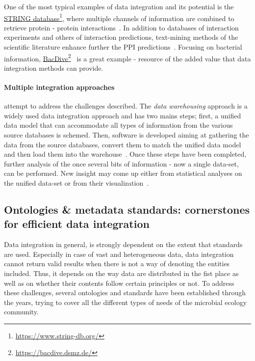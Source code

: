      One of the most typical examples of data integration and its potential
      is the \href{https://www.string-db.org/}{STRING database}\footnote{\href{https://www.string-db.org/}{https://www.string-db.org/}}, where multiple channels of information are combined 
      to retrieve protein - protein interactions~\citep{mering2003string, szklarczyk2021string}. 
      In addition to databases of interaction experiments and others of interaction predictions, text-mining methods of the scientific literature enhance further the 
      PPI predictions~\citep{szklarczyk2021string}.
      Focusing on bacterial information, \href{https://bacdive.dsmz.de/}{BacDive}\footnote{\href{https://bacdive.dsmz.de/}{https://bacdive.dsmz.de/}}~\citep{reimer2019bac}
      is a great example - resource of the added value that data integration methods can provide. 

      \paragraph{Multiple integration approaches} attempt to address the challenges described. 
      The \textit{data warehousing} approach is a widely used data integration approach and has two mains steps; 
      first, a unified data model that can accommodate all types of  
      information from the various source databases is schemed.
      Then, software is developed aiming at  
      gathering the data from the source databases, 
      convert them to match the unified data model and 
      then load them into the warehouse~\citep{stein2003integrating}.
      Once these steps have been completed, further analysis of the once
      several bits of information - now a single data-set, can be performed.
      New insight may come up either from statistical analyses on the unified
      data-set or from their visualization~\citep{leonelli2013integrating}.  

   \subsection{Ontologies \& metadata standards: cornerstones for efficient data integration}
   \label{subsec:metadata_intro}
      Data integration in general, 
      is strongly dependent on the extent that standards are used. 
      Especially in case of vast and heterogeneous data, 
      data integration cannot return valid results 
      when there is not a way
      of denoting the entities included.
      Thus, it depends on the way data are distributed in the fist place 
      as well as on whether their contents follow certain principles or not. 
      To address these challenges, several ontologies and standards have 
      been established through the years, trying to cover all the different 
      types of needs of the microbial ecology community. 

